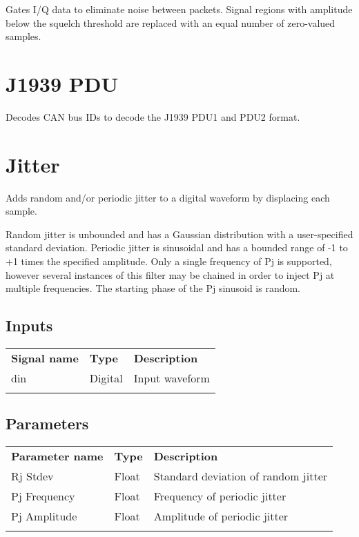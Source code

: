 Gates I/Q data to eliminate noise between packets. Signal regions with amplitude below the squelch threshold are
replaced with an equal number of zero-valued samples.

\pagebreak
\section{J1939 PDU}
\label{filter:j1939pdu}

Decodes CAN bus IDs to decode the J1939 PDU1 and PDU2 format.

\pagebreak
\section{Jitter}
\label{filter:jitter}

Adds random and/or periodic jitter to a digital waveform by displacing each sample.

Random jitter is unbounded and has a Gaussian distribution with a user-specified standard deviation. Periodic jitter is
sinusoidal and has a bounded range of -1 to +1 times the specified amplitude. Only a single frequency of Pj is
supported, however several instances of this filter may be chained in order to inject Pj at multiple frequencies. The
starting phase of the Pj sinusoid is random.

\subsection{Inputs}

\begin{tabularx}{16cm}{llX}
\thickhline
\textbf{Signal name} & \textbf{Type} & \textbf{Description} \\
\thickhline
din & Digital & Input waveform\\
\thickhline
\end{tabularx}

\subsection{Parameters}

\begin{tabularx}{16cm}{llX}
\thickhline
\textbf{Parameter name} & \textbf{Type} & \textbf{Description} \\
\thickhline
Rj Stdev & Float & Standard deviation of random jitter\\
\thinhline
Pj Frequency & Float & Frequency of periodic jitter\\
\thinhline
Pj Amplitude & Float & Amplitude of periodic jitter\\
\thickhline
\end{tabularx}

